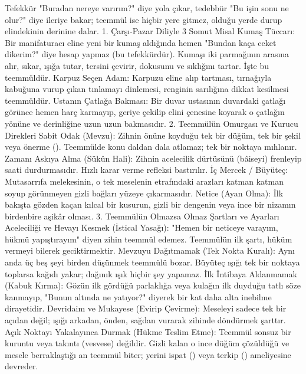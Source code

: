 \documentclass[11pt,a4paper]{article}
\begin{document}
Tefekkür "Buradan nereye varırım?" diye yola çıkar, tedebbür "Bu işin sonu ne olur?" diye ileriye bakar; teemmül ise hiçbir yere gitmez, olduğu yerde durup elindekinin derinine dalar.
1. Çarşı-Pazar Diliyle 3 Somut Misal
 Kumaş Tüccarı: Bir manifaturacı eline yeni bir kumaş aldığında hemen "Bundan kaça ceket dikerim?" diye hesap yapmaz (bu tefekkürdür). Kumaşı iki parmağının arasına alır, sıkar, ışığa tutar, tersini çevirir, dokusunu ve sıklığını tartar. İşte bu teemmüldür.
 Karpuz Seçen Adam: Karpuzu eline alıp tartması, tırnağıyla kabuğuna vurup çıkan tınlamayı dinlemesi, renginin sarılığına dikkat kesilmesi teemmüldür.
 Ustanın Çatlağa Bakması: Bir duvar ustasının duvardaki çatlağı görünce hemen harç karmayıp, geriye çekilip elini çenesine koyarak o çatlağın yönüne ve derinliğine uzun uzun bakmasıdır.
2. Teemmülün Omurgası ve Kurucu Direkleri
 Sabit Odak (Mevzu): Zihnin önüne koyduğu tek bir düğüm, tek bir şekil veya önerme (). Teemmülde konu daldan dala atlamaz; tek bir noktaya mıhlanır.
 Zamanı Askıya Alma (Sükûn Hali): Zihnin acelecilik dürtüsünü (bâiseyi) frenleyip saati durdurmasıdır. Hızlı karar verme refleksi bastırılır.
 İç Mercek / Büyüteç: Mutasarrıfa melekesinin, o tek meselenin etrafındaki arazları katman katman soyup görünmeyen gizli bağları yüzeye çıkarmasıdır.
 Netice (Ayan Olma): İlk bakışta gözden kaçan kılcal bir kusurun, gizli bir dengenin veya ince bir nizamın birdenbire aşikâr olması.
3. Teemmülün Olmazsa Olmaz Şartları ve Ayarları
 Aceleciliği ve Hevayı Kesmek (İstical Yasağı):
"Hemen bir neticeye varayım, hükmü yapıştırayım" diyen zihin teemmül edemez. Teemmülün ilk şartı, hüküm vermeyi bilerek geciktirmektir.
 Mevzuyu Dağıtmamak (Tek Nokta Kuralı):
Aynı anda üç beş şeyi birden düşünmek teemmülü bozar. Büyüteç ışığı tek bir noktaya toplarsa kağıdı yakar; dağınık ışık hiçbir şey yapamaz.
 İlk İntibaya Aldanmamak (Kabuk Kırma):
Gözün ilk gördüğü parlaklığa veya kulağın ilk duyduğu tatlı söze kanmayıp, "Bunun altında ne yatıyor?" diyerek bir kat daha alta inebilme dirayetidir.
 Devridaim ve Mukayese (Evirip Çevirme):
Meseleyi sadece tek bir açıdan değil; ışığı arkadan, önden, sağdan vurarak zihinde döndürmek şarttır.
 Açık Noktayı Yakalayınca Durmak (Hükme Teslim Etme):
Teemmül sonsuz bir kuruntu veya takıntı (vesvese) değildir. Gizli kalan o ince düğüm çözüldüğü ve mesele berraklaştığı an teemmül biter; yerini ispat () veya terkip () ameliyesine devreder.
\end{document}
